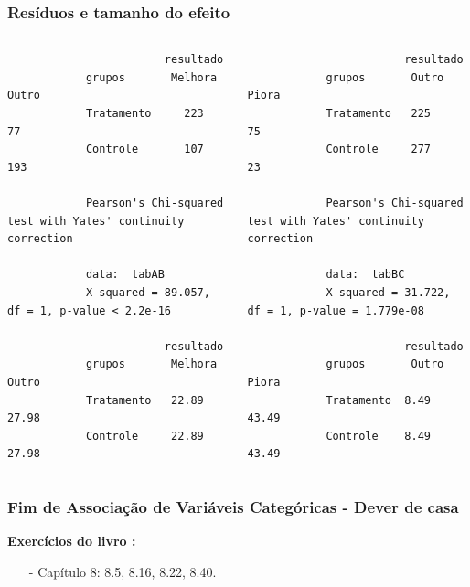 \documentclass[graphics,14pt]{beamer}
\begin{document}
\begin{frame}[t,fragile=singleslide]
\frametitle{Resíduos e tamanho do efeito}
	\begin{columns}[T] %
		\begin{column}{.48\textwidth}
			\begin{lstlisting}
			            resultado
			grupos       Melhora Outro
			Tratamento     223    77
			Controle       107   193
			
			Pearson's Chi-squared test with Yates' continuity correction
			
			data:  tabAB
			X-squared = 89.057, df = 1, p-value < 2.2e-16
			
			            resultado
			grupos       Melhora Outro
			Tratamento   22.89 	27.98
			Controle     22.89 	27.98
			\end{lstlisting}
		\end{column}%
		\hfill%
		\begin{column}{.48\textwidth}	
			\begin{lstlisting}
			            resultado
			grupos       Outro Piora
			Tratamento   225    75
			Controle     277    23
			
			Pearson's Chi-squared test with Yates' continuity correction
			
			data:  tabBC
			X-squared = 31.722, df = 1, p-value = 1.779e-08
			
			            resultado
			grupos       Outro Piora
			Tratamento  8.49 	43.49
			Controle    8.49 	43.49
			\end{lstlisting}			
		\end{column}%
	\end{columns}

\end{frame}
\begin{frame}[t,fragile=singleslide]
\frametitle{Fim de Associação de Variáveis Categóricas - Dever de casa}
\textbf{Exercícios do livro \cite{Agresti2018}:}
\begin{itemize}
	\item[-] Capítulo 8: 8.5, 8.16, 8.22, 8.40.
\end{itemize}
\end{frame}
\end{document}
